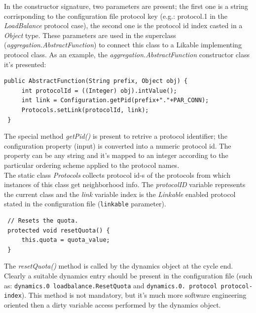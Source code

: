 \documentclass[a4paper,11pt]{article}
\begin{document}
In the constructor signature, two parameters are present; the first
one is a string corrisponding to the configuration file protocol key
(e.g.: protocol.1 in the \emph{LoadBalance} protocol case), the second
one is the protocol id index casted in a \emph{Object} type. These
parameters are used in the superclass (\emph{aggregation.AbstractFunction})
to connect this class to a Likable implementing protocol class. As
an example, the \emph{aggregation.AbstractFunction} constructor class
it's presented:\\

\footnotesize
\begin{verbatim}
public AbstractFunction(String prefix, Object obj) {
     int protocolId = ((Integer) obj).intValue();
     int link = Configuration.getPid(prefix+"."+PAR_CONN);
     Protocols.setLink(protocolId, link);
 }
\end{verbatim}
\normalsize


The special method \emph{getPid()} is present to retrive a protocol
identifier; the configuration property (input) is converted into a 
numeric protocol id. The property can be any string and it's mapped to
an integer according to the particular ordering scheme applied to the
protocol names.\\
The static class \emph{Protocols} collects protocol id-s of the protocols
from which instances of this class get neighborhood info. The \emph{protocolID}
variable represents the current class and the \emph{link} variable
index is the \emph{Linkable} enabled protocol stated in the configuration
file (\texttt{linkable} parameter).\\

\footnotesize
\begin{verbatim}
 // Resets the quota. 
 protected void resetQuota() {
     this.quota = quota_value;
 }
\end{verbatim}
\normalsize

The \emph{resetQuota()} method is called by the dynamics object at
the cycle end. Clearly a suitable dynamics entry should be present
in the configuration file (such as: \texttt{dynamics.0 loadbalance.ResetQuota}
and \texttt{dynamics.0. protocol protocol-index}). This method is not
mandatory, but it's much more software engineering oriented then a
dirty variable access performed by the dynamics object.\\
\end{document}
